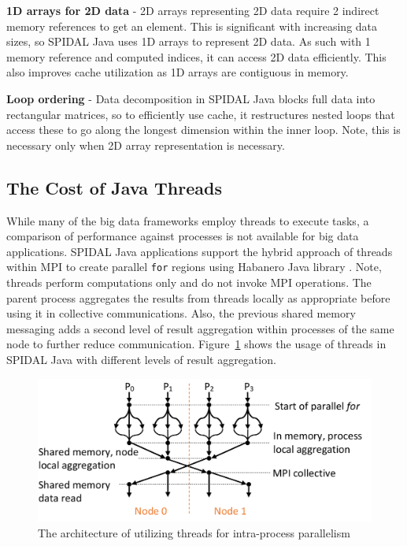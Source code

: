 \textbf{1D arrays for 2D data} - 2D arrays representing 2D data require 2 indirect memory references to get an element. This is significant with increasing data sizes, so SPIDAL Java uses 1D arrays to represent 2D data. As such with 1 memory reference and computed indices, it can access 2D data efficiently. This also improves cache utilization as 1D arrays are contiguous in memory.

\textbf{Loop ordering} - Data decomposition in SPIDAL Java blocks full data into rectangular matrices, so to efficiently use cache, it restructures nested loops that access these to go along the longest dimension within the inner loop. Note, this is necessary only when 2D array representation is necessary. 

\subsection{The Cost of Java Threads}
While many of the big data frameworks employ threads to execute tasks, a comparison of performance against processes is not available for big data applications. SPIDAL Java applications support the hybrid approach of threads within MPI to create parallel \texttt{for} regions using Habanero Java library \cite{Imam:2014:HLJ:2647508.2647514}. Note, threads perform computations only and do not invoke MPI operations. The parent process aggregates the results from threads locally as appropriate before using it in collective communications. Also, the previous shared memory messaging adds a second level of result aggregation within processes of the same node to further reduce communication. Figure~\ref{fig:fig_thread_parallelism} shows the usage of threads in SPIDAL Java with different levels of result aggregation. 

\begin{figure}
\centering
\includegraphics[width=0.9\columnwidth]{figures/fig_thread_parallelism}
\caption{The architecture of utilizing threads for intra-process parallelism}
\label{fig:fig_thread_parallelism}
\end{figure}

